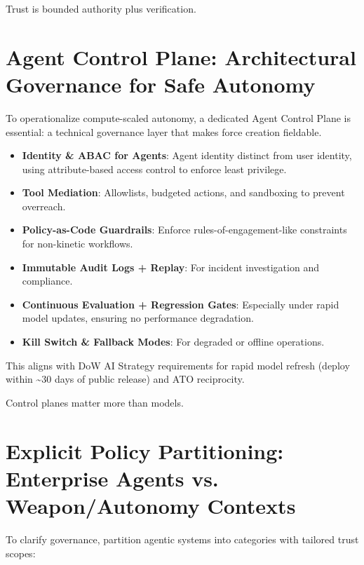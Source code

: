 \documentclass[11pt]{article}
\begin{document}
\begin{calloutquote}
Trust is bounded authority plus verification.
\end{calloutquote}

\section{Agent Control Plane: Architectural Governance for Safe Autonomy}\label{agent-control-plane-architectural-governance-for-safe-autonomy}

To operationalize compute-scaled autonomy, a dedicated Agent Control Plane is essential: a technical governance layer that makes force creation fieldable.

\begin{itemize}
\item
  \textbf{Identity \& ABAC for Agents}: Agent identity distinct from user identity, using attribute-based access control to enforce least privilege.
\item
  \textbf{Tool Mediation}: Allowlists, budgeted actions, and sandboxing to prevent overreach.
\item
  \textbf{Policy-as-Code Guardrails}: Enforce rules-of-engagement-like constraints for non-kinetic workflows.
\item
  \textbf{Immutable Audit Logs + Replay}: For incident investigation and compliance.
\item
  \textbf{Continuous Evaluation + Regression Gates}: Especially under rapid model updates, ensuring no performance degradation.
\item
  \textbf{Kill Switch \& Fallback Modes}: For degraded or offline operations.
\end{itemize}

This aligns with DoW AI Strategy requirements for rapid model refresh (deploy within \textasciitilde30 days of public release) and ATO reciprocity.

\begin{calloutquote}
Control planes matter more than models.
\end{calloutquote}

\section{Explicit Policy Partitioning: Enterprise Agents vs. Weapon/Autonomy Contexts}\label{explicit-policy-partitioning-enterprise-agents-vs-weaponautonomy-contexts}

To clarify governance, partition agentic systems into categories with tailored trust scopes:
\end{document}
